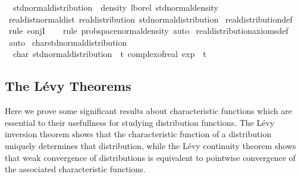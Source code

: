 \documentclass{article}
\theoremstyle{definition}
\begin{document}
\medskip

\begin{isabellebody}
\isamarkupfalse%
\isanewline
\ \ {\isachardoublequoteopen}std{\isacharunderscore}normal{\isacharunderscore}distribution\ {\isasymequiv}\ density\ lborel\ std{\isacharunderscore}normal{\isacharunderscore}density{\isachardoublequoteclose}\isanewline
\isanewline
\isanewline
{}\isamarkupfalse%
\ real{\isacharunderscore}dist{\isacharunderscore}normal{\isacharunderscore}dist{\isacharcolon}\ {\isachardoublequoteopen}real{\isacharunderscore}distribution\ std{\isacharunderscore}normal{\isacharunderscore}distribution{\isachardoublequoteclose}\isanewline
{}\isamarkupfalse%
\ real{\isacharunderscore}distribution{\isacharunderscore}def\isanewline
\ \ \isamarkupfalse%
\ {\isacharparenleft}rule\ conjI{\isacharparenright}\isanewline
\ \ \isamarkupfalse%
\ {\isacharparenleft}rule\ prob{\isacharunderscore}space{\isacharunderscore}normal{\isacharunderscore}density{\isacharcomma}\ auto{\isacharparenright}\isanewline
{}\isamarkupfalse%
\ real{\isacharunderscore}distribution{\isacharunderscore}axioms{\isacharunderscore}def\ \isamarkupfalse%
\ auto
\isanewline
{}\isamarkupfalse%
\ char{\isacharunderscore}std{\isacharunderscore}normal{\isacharunderscore}distribution{\isacharcolon}\isanewline
\ \ {\isachardoublequoteopen}char\ std{\isacharunderscore}normal{\isacharunderscore}distribution\ {\isacharequal}\ {\isacharparenleft}{\isasymlambda}t{\isachardot}\ complex{\isacharunderscore}of{\isacharunderscore}real\ {\isacharparenleft}exp\ {\isacharparenleft}{\isacharminus}\ {\isacharparenleft}t{\isacharcircum}{}{\isacharparenright}\ {\isacharslash}\ {}{\isacharparenright}{\isacharparenright}{\isacharparenright}{\isachardoublequoteclose}
\end{isabellebody}

\subsection{The L\'evy Theorems}

Here we prove some significant results about characteristic functions which are essential to their usefullness for studying distribution functions. The L\'evy inversion theorem shows that the characteristic function of a distribution uniquely determines that distribution, while the L\'evy continuity theorem shows that weak convergence of distributions is equivalent to pointwise convergence of the associated characteristic functions.
\end{document}
